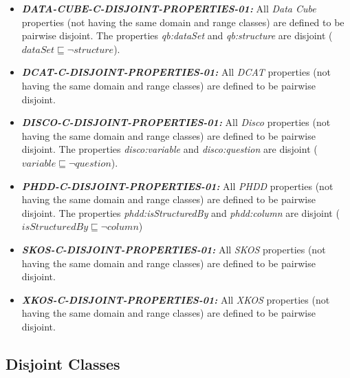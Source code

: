 \documentclass{llncs}
\begin{document}
\begin{itemize}
	\item \textbf{{\em DATA-CUBE-C-DISJOINT-PROPERTIES-01:}} 
	All \emph{Data Cube} properties (not having the same domain and range classes) are defined to be pairwise disjoint.
  The properties \emph{qb:dataSet} and \emph{qb:structure} are disjoint ($dataSet \sqsubseteq \neg structure$).
\end{itemize}

\begin{itemize}
	\item \textbf{{\em DCAT-C-DISJOINT-PROPERTIES-01:}} 
	All \emph{DCAT} properties (not having the same domain and range classes) are defined to be pairwise disjoint.
\end{itemize}

\begin{itemize}
	\item \textbf{{\em DISCO-C-DISJOINT-PROPERTIES-01:}} 
	All \emph{Disco} properties (not having the same domain and range classes) are defined to be pairwise disjoint.
  The properties \emph{disco:variable} and \emph{disco:question} are disjoint ($variable \sqsubseteq \neg question$).
\end{itemize}

\begin{itemize}
	\item \textbf{{\em PHDD-C-DISJOINT-PROPERTIES-01:}} 
	All \emph{PHDD} properties (not having the same domain and range classes) are defined to be pairwise disjoint.
	The properties \emph{phdd:isStructuredBy} and \emph{phdd:column} are disjoint ($isStructuredBy \sqsubseteq \neg column$)
\end{itemize}

\begin{itemize}
	\item \textbf{{\em SKOS-C-DISJOINT-PROPERTIES-01:}} 
	All \emph{SKOS} properties (not having the same domain and range classes) are defined to be pairwise disjoint.
\end{itemize}

\begin{itemize}
	\item \textbf{{\em XKOS-C-DISJOINT-PROPERTIES-01:}} 
	All \emph{XKOS} properties (not having the same domain and range classes) are defined to be pairwise disjoint.
\end{itemize}

\subsection{Disjoint Classes}
\end{document}
